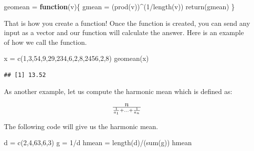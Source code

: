 \documentclass[
]{article}
\newenvironment{Shaded}{\begin{snugshade}}{\end{snugshade}}
\newcommand{\ControlFlowTok}[1]{\textcolor[rgb]{0.13,0.29,0.53}{\textbf{#1}}}
\newcommand{\DecValTok}[1]{\textcolor[rgb]{0.00,0.00,0.81}{#1}}
\newcommand{\FunctionTok}[1]{\textcolor[rgb]{0.00,0.00,0.00}{#1}}
\newcommand{\NormalTok}[1]{#1}
\newcommand{\OtherTok}[1]{\textcolor[rgb]{0.56,0.35,0.01}{#1}}
\newcommand{\SpecialCharTok}[1]{\textcolor[rgb]{0.00,0.00,0.00}{#1}}
\begin{document}
\begin{Shaded}
\begin{Highlighting}[]
\NormalTok{geomean }\OtherTok{=} \ControlFlowTok{function}\NormalTok{(v)\{}
\NormalTok{gmean }\OtherTok{=}\NormalTok{ (}\FunctionTok{prod}\NormalTok{(v))}\SpecialCharTok{\^{}}\NormalTok{(}\DecValTok{1}\SpecialCharTok{/}\FunctionTok{length}\NormalTok{(v))}
\FunctionTok{return}\NormalTok{(gmean)}
\NormalTok{\}}
\end{Highlighting}
\end{Shaded}

That is how you create a function! Once the function is created, you can
send any input as a vector and our function will calculate the answer.
Here is an example of how we call the function.

\begin{Shaded}
\begin{Highlighting}[]
\NormalTok{x }\OtherTok{=} \FunctionTok{c}\NormalTok{(}\DecValTok{1}\NormalTok{,}\DecValTok{3}\NormalTok{,}\DecValTok{54}\NormalTok{,}\DecValTok{9}\NormalTok{,}\DecValTok{29}\NormalTok{,}\DecValTok{234}\NormalTok{,}\DecValTok{6}\NormalTok{,}\DecValTok{2}\NormalTok{,}\DecValTok{8}\NormalTok{,}\DecValTok{2456}\NormalTok{,}\DecValTok{2}\NormalTok{,}\DecValTok{8}\NormalTok{)}
\FunctionTok{geomean}\NormalTok{(x)}
\end{Highlighting}
\end{Shaded}

\begin{verbatim}
## [1] 13.52
\end{verbatim}

As another example, let us compute the harmonic mean which is defined
as:

\[{n}\over{{1\over{a_1}}+...+{1\over{a_n}}}\]

The following code will give us the harmonic mean.

\begin{Shaded}
\begin{Highlighting}[]
\NormalTok{d }\OtherTok{=} \FunctionTok{c}\NormalTok{(}\DecValTok{2}\NormalTok{,}\DecValTok{4}\NormalTok{,}\DecValTok{63}\NormalTok{,}\DecValTok{6}\NormalTok{,}\DecValTok{3}\NormalTok{)}
\NormalTok{g }\OtherTok{=} \DecValTok{1}\SpecialCharTok{/}\NormalTok{d}
\NormalTok{hmean }\OtherTok{=} \FunctionTok{length}\NormalTok{(d)}\SpecialCharTok{/}\NormalTok{(}\FunctionTok{sum}\NormalTok{(g))}
\NormalTok{hmean}
\end{Highlighting}
\end{Shaded}
\end{document}
